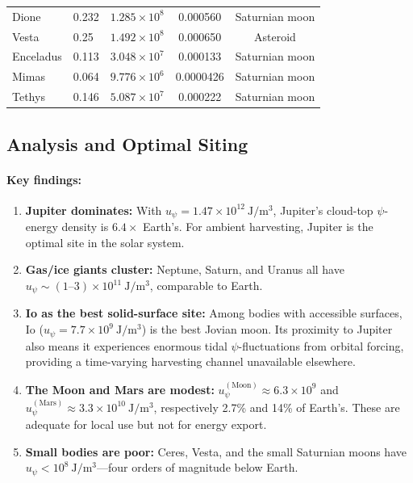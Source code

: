 \documentclass[aps,prd,twocolumn,showpacs,preprintnumbers,superscriptaddress,nofootinbib]{revtex4-2}
\begin{document}
\begin{table}[t]
\begin{ruledtabular}
\begin{tabular}{llccc}
Dione       & 0.232  & $1.285\times 10^{8}$  & 0.000560 & Saturnian moon \\
Vesta       & 0.25   & $1.492\times 10^{8}$  & 0.000650 & Asteroid \\
Enceladus   & 0.113  & $3.048\times 10^{7}$  & 0.000133 & Saturnian moon \\
Mimas       & 0.064  & $9.776\times 10^{6}$  & 0.0000426 & Saturnian moon \\
Tethys      & 0.146  & $5.087\times 10^{7}$  & 0.000222 & Saturnian moon \\
\end{tabular}
\end{ruledtabular}
\end{table}

\subsection{Analysis and Optimal Siting}\label{sec:optimal}

\paragraph{Key findings:}

\begin{enumerate}
\item \textbf{Jupiter dominates:} With $u_\psi = 1.47\times 10^{12}~\mathrm{J/m^3}$,
Jupiter's cloud-top $\psi$-energy density is $6.4\times$ Earth's.
For ambient harvesting, Jupiter is the optimal site in the solar system.

\item \textbf{Gas/ice giants cluster:} Neptune, Saturn, and Uranus all
have $u_\psi \sim (1\text{--}3)\times 10^{11}~\mathrm{J/m^3}$,
comparable to Earth.

\item \textbf{Io as the best solid-surface site:}  Among bodies with
accessible surfaces, Io ($u_\psi = 7.7\times 10^9~\mathrm{J/m^3}$)
is the best Jovian moon.  Its proximity to Jupiter also means it
experiences enormous tidal $\psi$-fluctuations from orbital forcing,
providing a time-varying harvesting channel unavailable elsewhere.

\item \textbf{The Moon and Mars are modest:}
$u_\psi^{(\mathrm{Moon})} \approx 6.3\times 10^9$ and
$u_\psi^{(\mathrm{Mars})} \approx 3.3\times 10^{10}~\mathrm{J/m^3}$,
respectively 2.7\% and 14\% of Earth's.  These are adequate for local
use but not for energy export.

\item \textbf{Small bodies are poor:} Ceres, Vesta, and the small
Saturnian moons have $u_\psi < 10^8~\mathrm{J/m^3}$---four orders
of magnitude below Earth.
\end{enumerate}
\end{document}
